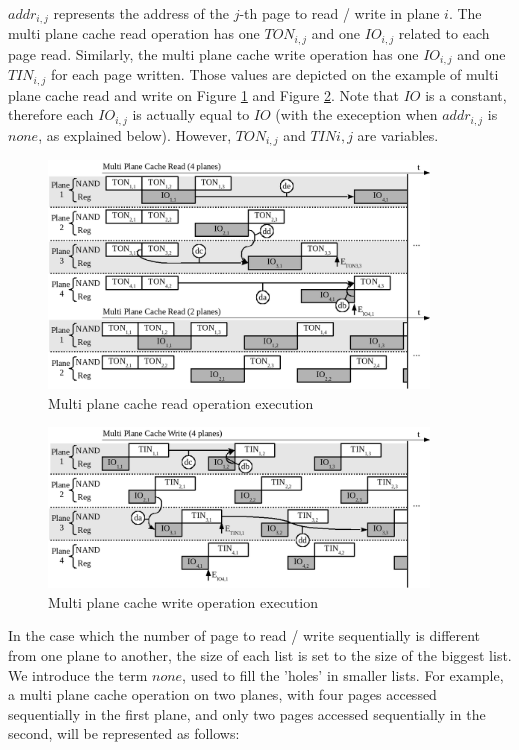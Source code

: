 \documentclass[oneside]{memoir}
\begin{document}
$addr_{i,j}$ represents the address of the $j$-th page to read / write in plane $i$. The multi plane cache read operation has one $TON_{i,j}$ and one $IO_{i,j}$ related to each page read. Similarly, the multi plane cache write operation has one $IO_{i,j}$ and one $TIN_{i,j}$ for each page written. Those values are depicted on the example of multi plane cache read and write on Figure \ref{fig:mpcr} and Figure \ref{fig:mpcw}. Note that $IO$ is a constant, therefore each $IO_{i,j}$ is actually equal to $IO$ (with the exeception when $addr_{i,j}$ is $none$, as explained below). However, $TON_{i,j}$ and $TIN{i,j}$ are variables.

\begin{figure}
  \center
  \includegraphics[width=0.9\textwidth]{Includes/MultiPlaneCacheRead.png}
  \caption{Multi plane cache read operation execution}
  \label{fig:mpcr}
\end{figure}

\begin{figure}
  \center
  \includegraphics[width=0.9\textwidth]{Includes/MultiPlaneCacheWrite.png}
  \caption{Multi plane cache write operation execution}
  \label{fig:mpcw}
\end{figure}

In the case which the number of page to read / write sequentially is different from one plane to another, the size of each list is set to the size of the biggest list. We introduce the term $none$, used to fill the 'holes' in smaller lists. For example, a multi plane cache operation on two planes, with four pages accessed sequentially in the first plane, and only two pages accessed sequentially in the second, will be represented as follows:
\begin{align} [ addr_{1,1}, addr_{1,2}, addr_{1,3}, addr_{1,4}, addr_{2,1}, addr_{2,2}, addr_{2,3}=none, \notag\\addr_{2,4}=none ] \label{eq:none}\end{align}
\end{document}
